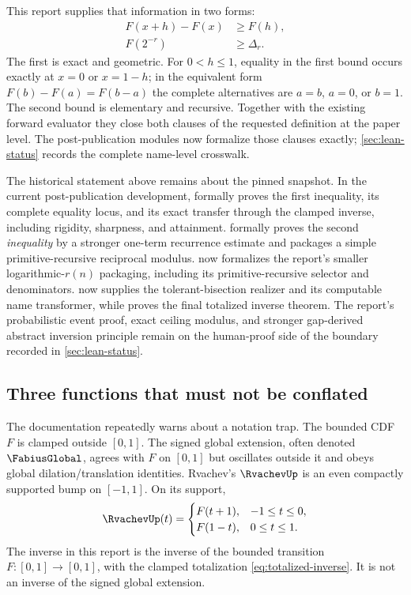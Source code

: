 \documentclass[11pt,oneside]{article}
\theoremstyle{definition}
\theoremstyle{remark}
\numberwithin{equation}{section}
\begin{document}
This report supplies that information in two forms:
\begin{align}
 F(x+h)-F(x)&\ge F(h),\label{eq:gap-interval-preview}\\
 F(2^{-r})&\ge\Delta_r.\label{eq:gap-delta-preview}
\end{align}
The first is exact and geometric.  For $0<h\le1$, equality in the first bound
occurs exactly at $x=0$ or $x=1-h$; in the equivalent form
$F(b)-F(a)=F(b-a)$ the complete alternatives are $a=b$, $a=0$, or $b=1$.
The second bound is elementary and recursive.
Together with the existing forward evaluator they close both clauses of the
requested definition at the paper level.  The post-publication modules now
formalize those clauses exactly; \cref{sec:lean-status} records the complete
name-level crosswalk.

The historical statement above remains about the pinned snapshot.  In the
current post-publication development,  formally
proves the first inequality, its complete equality locus, and its exact
transfer through the clamped inverse, including rigidity, sharpness, and
attainment.
 formally proves the second
\emph{inequality} by a stronger one-term recurrence estimate and packages a
simple primitive-recursive reciprocal modulus.
 now formalizes the report's smaller
logarithmic-$r(n)$ packaging, including its primitive-recursive selector and
denominators.   now supplies the
tolerant-bisection realizer and its computable name transformer, while
 proves the final totalized inverse theorem.
The report's probabilistic event proof, exact ceiling modulus, and stronger
gap-derived abstract inversion principle remain on the human-proof side of the
boundary recorded in \cref{sec:lean-status}.

\subsection{Three functions that must not be conflated}

The documentation repeatedly warns about a notation trap.  The bounded CDF
$F$ is clamped outside $[0,1]$.  The signed global extension, often denoted
$\FabiusGlobal$, agrees with $F$ on $[0,1]$ but oscillates outside it and obeys
global dilation/translation identities.  Rvachev's $\RvachevUp$ is an even compactly
supported bump on $[-1,1]$.  On its support,
\begin{equation}\label{eq:up-F-relation}
 \RvachevUp(t)=
 \begin{cases}
   F(t+1),&-1\le t\le0,\\
   F(1-t),&0\le t\le1.
 \end{cases}
\end{equation}
The inverse in this report is the inverse of the bounded transition
$F:[0,1]\to[0,1]$, with the clamped totalization \eqref{eq:totalized-inverse}.
It is not an inverse of the signed global extension.
\end{document}
